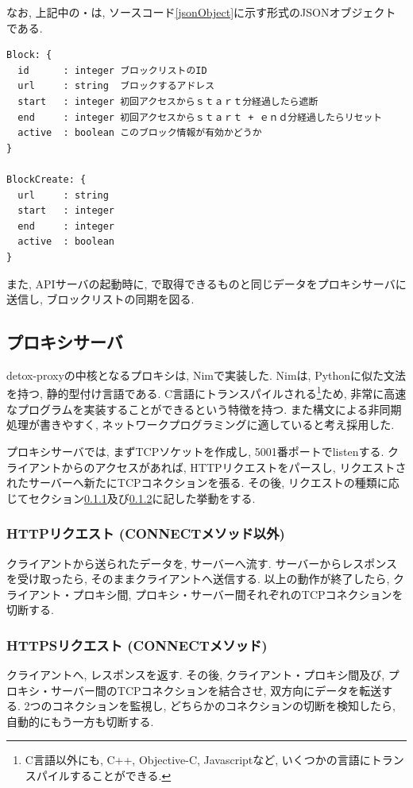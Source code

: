 \documentclass[10pt,a4paper,uplatex,a4j,dvipdfmx]{jsarticle}
\begin{document}
\begin{multicols}{2}
       なお, 上記中の・は, ソースコード\ref{jsonObject}に示す形式のJSONオブジェクトである.

       \begin{lstlisting}[caption=各JSONオブジェクト,label=jsonObject]
Block: {
  id      : integer ブロックリストのID
  url     : string  ブロックするアドレス
  start   : integer 初回アクセスからｓｔａｒｔ分経過したら遮断
  end     : integer 初回アクセスからｓｔａｒｔ + ｅｎｄ分経過したらリセット 
  active  : boolean このブロック情報が有効かどうか
}

BlockCreate: {
  url     : string
  start   : integer
  end     : integer
  active  : boolean
}
      \end{lstlisting}

また, APIサーバの起動時に, で取得できるものと同じデータをプロキシサーバに送信し, ブロックリストの同期を図る.

  \subsection{プロキシサーバ}
    
    detox-proxyの中核となるプロキシは, Nim\cite{nim}で実装した.
    Nimは, Pythonに似た文法を持つ, 静的型付け言語である. C言語にトランスパイルされる\footnote{C言語以外にも, C++, Objective-C, Javascriptなど, いくつかの言語にトランスパイルすることができる.}ため, 非常に高速なプログラムを実装することができるという特徴を持つ. また構文による非同期処理が書きやすく, ネットワークプログラミングに適していると考え採用した.
    
    プロキシサーバでは, まずTCPソケットを作成し, 5001番ポートでlistenする.
    クライアントからのアクセスがあれば, HTTPリクエストをパースし, リクエストされたサーバーへ新たにTCPコネクションを張る. その後, リクエストの種類に応じてセクション\ref{sec:proxy:http}及び\ref{sec:proxy:https}に記した挙動をする.
    \subsubsection{HTTPリクエスト (CONNECTメソッド以外)}
    \label{sec:proxy:http}
    クライアントから送られたデータを, サーバーへ流す.
    サーバーからレスポンスを受け取ったら, そのままクライアントへ送信する.
    以上の動作が終了したら, クライアント・プロキシ間, プロキシ・サーバー間それぞれのTCPコネクションを切断する.
    
    \subsubsection{HTTPSリクエスト (CONNECTメソッド)}
    \label{sec:proxy:https}
    クライアントへ, レスポンスを返す.
    その後, クライアント・プロキシ間及び, プロキシ・サーバー間のTCPコネクションを結合させ, 双方向にデータを転送する.
    2つのコネクションを監視し, どちらかのコネクションの切断を検知したら, 自動的にもう一方も切断する.
    

\end{multicols}
\end{document}

